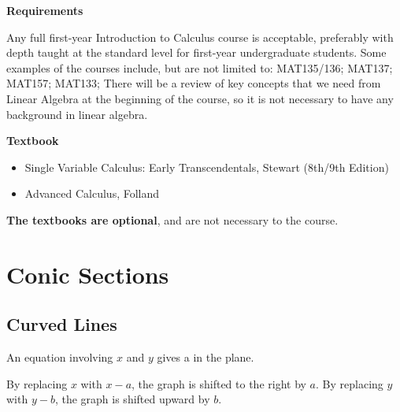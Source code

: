 \documentclass[11pt,fleqn]{book} %
\begin{document}
\textbf{Requirements}

Any full first-year Introduction to Calculus course is acceptable, preferably with depth taught at the standard level for first-year undergraduate students. Some examples of the courses include, but are not limited to: MAT135/136; MAT137; MAT157; MAT133; There will be a review of key concepts that we need from Linear Algebra at the beginning of the course, so it is not necessary to have any background in linear algebra.

\textbf{Textbook}

\begin{itemize}
    \item Single Variable Calculus: Early Transcendentals, Stewart (8th/9th Edition) \cite{Stewart}
    \item Advanced Calculus, Folland
\end{itemize}

\textbf{The textbooks are optional}, and are not necessary to the course. 


\chapter{Conic Sections}

\section{Curved Lines}

An equation involving $x$ and $y$ gives a  in the plane.

By replacing $x$ with $x - a$, the graph is shifted to the right by $a$. By replacing $y$ with $y - b$, the graph is shifted upward by $b$.

\begin{center}
\end{center}
\end{document}

